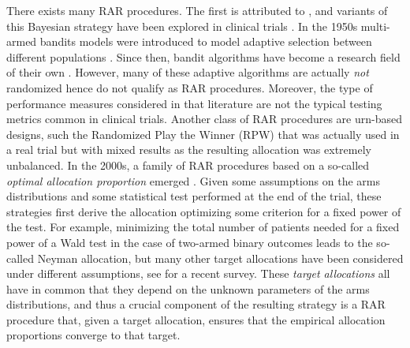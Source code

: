 \documentclass[11pt]{article}
\theoremstyle{plain}
\theoremstyle{definition}
\begin{document}
There exists many RAR procedures. The first is attributed to \citep{Thompson33}, and variants of this Bayesian strategy have been explored in clinical trials \citep{Thall07}. In the 1950s multi-armed bandits models were introduced to model adaptive selection between different populations \citep{Robbins52Freq} . Since then, bandit algorithms have become a research field of their own \citep{BanditBook}. However, many of these adaptive algorithms are actually \emph{not} randomized hence do not qualify as RAR procedures. Moreover, the type of performance measures considered in that literature are not the typical testing metrics common in clinical trials. Another class of RAR procedures are urn-based designs, such the Randomized Play the Winner (RPW) \citep{WeiDurham78RPW} that was actually used in a real trial \citep{Bartlett85ECMO} but with mixed results as the resulting allocation was extremely unbalanced. In the 2000s, a family of RAR procedures based on a so-called \emph{optimal allocation proportion} emerged \citep{Rosenberger01Opt}. Given some assumptions on the arms distributions and some statistical test performed at the end of the trial, these strategies first derive the allocation optimizing some criterion for a fixed power of the test. For example, minimizing the total number of patients needed for a fixed power of a Wald test in the case of two-armed binary outcomes leads to the so-called Neyman allocation, but many other target allocations have been considered under different assumptions, see \citep{pin2024response} for a recent survey. These \emph{target allocations} all have in common that they depend on the unknown parameters of the arms distributions, and thus a crucial component of the resulting strategy is a RAR procedure that, given a target allocation, ensures that the empirical allocation proportions converge to that target.
\end{document}
